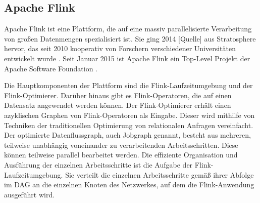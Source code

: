 \subsection{Apache Flink}

Apache Flink ist eine Plattform, die auf eine massiv parallelisierte Verarbeitung von großen Datenmengen spezialisiert ist. Sie ging 2014 [Quelle] aus Stratosphere hervor, das seit 2010 kooperativ von Forschern verschiedener Universitäten entwickelt wurde \cite{Battre2010, Alexandrov2014}. Seit Januar 2015 ist Apache Flink ein Top-Level Projekt der Apache Software Foundation \cite{ApacheFlinkBlogEntry}. 

Die Hauptkomponenten der Plattform sind die Flink-Laufzeitumgebung und der Flink-Optimierer. Darüber hinaus gibt es Flink-Operatoren, die auf einen Datensatz angewendet werden können. Der Flink-Optimierer erhält einen azyklischen Graphen von Flink-Operatoren als Eingabe. Dieser wird mithilfe von Techniken der traditionellen Optimierung von relationalen Anfragen vereinfacht. Der optimierte Datenflussgraph, auch Jobgraph genannt, besteht aus mehreren, teilweise unabhängig voneinander zu verarbeitenden Arbeitsschritten. Diese können teilweise parallel bearbeitet werden. Die effiziente Organisation und Ausführung der einzelnen Arbeitsschritte ist die Aufgabe der Flink-Laufzeitumgebung. Sie verteilt die einzelnen Arbeitsschritte gemäß ihrer Abfolge im DAG an die einzelnen Knoten des Netzwerkes, auf dem die Flink-Anwendung ausgeführt wird. 

